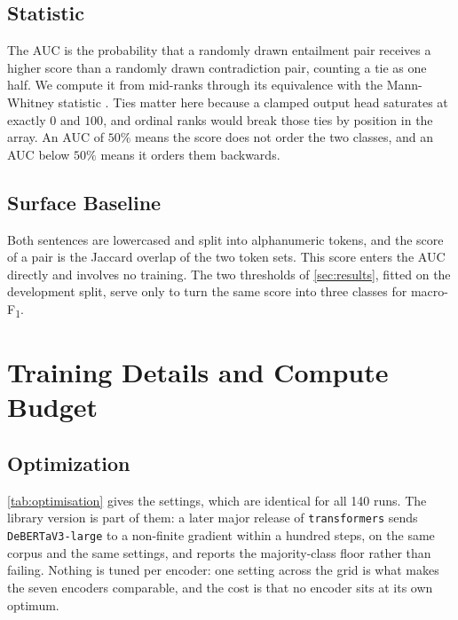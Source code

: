 \documentclass[11pt]{article}
\begin{document}
\subsection{Statistic}

The AUC is the probability that a randomly drawn entailment pair receives a higher score than a randomly drawn contradiction pair, counting a tie as one half.
We compute it from mid-ranks through its equivalence with the Mann-Whitney statistic \citep{mann1947whitney,hanley1982auc}.
Ties matter here because a clamped output head saturates at exactly $0$ and $100$, and ordinal ranks would break those ties by position in the array.
An AUC of $50\%$ means the score does not order the two classes, and an AUC below $50\%$ means it orders them backwards.

\subsection{Surface Baseline}

Both sentences are lowercased and split into alphanumeric tokens, and the score of a pair is the Jaccard overlap of the two token sets.
This score enters the AUC directly and involves no training.
The two thresholds of \autoref{sec:results}, fitted on the development split, serve only to turn the same score into three classes for macro-F\textsubscript{1}.

\section{Training Details and Compute Budget}
\label{an:training}

\subsection{Optimization}

\autoref{tab:optimisation} gives the settings, which are identical for all 140 runs.
The library version is part of them: a later major release of \texttt{transformers} sends \texttt{DeBERTaV3-large} to a non-finite gradient within a hundred steps, on the same corpus and the same settings, and reports the majority-class floor rather than failing.
Nothing is tuned per encoder: one setting across the grid is what makes the seven encoders comparable, and the cost is that no encoder sits at its own optimum.
\end{document}
